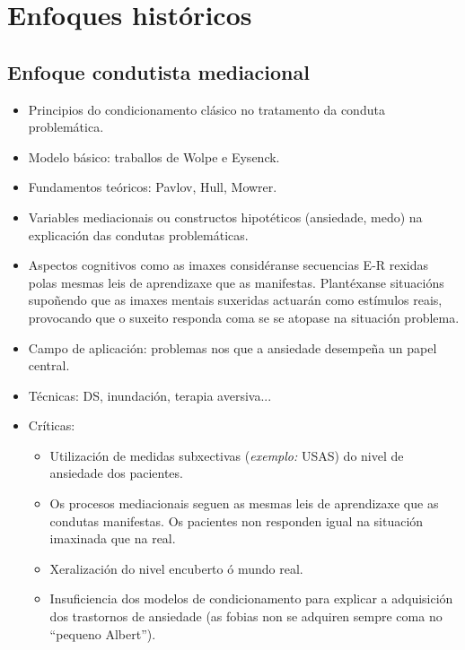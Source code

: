 \documentclass[a4paper,11pt]{article}
\begin{document}
\section{Enfoques históricos}
\subsection{Enfoque condutista mediacional}
\begin{itemize}
	\item Principios do condicionamento clásico no tratamento da conduta problemática.
	\item Modelo básico: traballos de Wolpe e Eysenck.
	\item Fundamentos teóricos: Pavlov, Hull, Mowrer.
	\item Variables mediacionais ou constructos hipotéticos (ansiedade, medo) na explicación das 
	condutas problemáticas.
	\item Aspectos cognitivos como as imaxes considéranse secuencias E-R rexidas polas mesmas leis de 
	aprendizaxe que as manifestas. Plantéxanse situacións supoñendo que as imaxes mentais suxeridas 
	actuarán como estímulos reais, provocando que o suxeito responda coma se se atopase na situación 
	problema.
	\item Campo de aplicación: problemas nos que a ansiedade desempeña un papel central.
	\item Técnicas: DS, inundación, terapia aversiva...
	\item Críticas:
	\begin{itemize}
		\item Utilización de medidas subxectivas (\textit{exemplo:} USAS) do nivel de ansiedade dos 
		pacientes.
		\item Os procesos mediacionais seguen as mesmas leis de aprendizaxe que as condutas 
		manifestas. Os pacientes non responden igual na situación imaxinada que na real.
		\item Xeralización do nivel encuberto ó mundo real.
		\item Insuficiencia dos modelos de condicionamento para explicar a adquisición dos trastornos 
		de ansiedade (as fobias non se adquiren sempre coma no ``pequeno Albert''). 
	\end{itemize}
\end{itemize}
\end{document}
